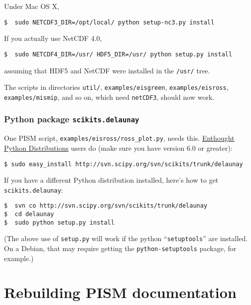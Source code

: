 \documentclass[11pt,final]{amsart}
\begin{document}
Under Mac OS X,
\begin{verbatim}
$  sudo NETCDF3_DIR=/opt/local/ python setup-nc3.py install
\end{verbatim}
If you actually use NetCDF 4.0,
\begin{verbatim}
$  sudo NETCDF4_DIR=/usr/ HDF5_DIR=/usr/ python setup.py install
\end{verbatim}
assuming that HDF5 and NetCDF were installed in the \texttt{/usr/} tree.

The scripts in directories \texttt{util/}, \texttt{examples/eisgreen}, \texttt{examples/eisross}, \texttt{examples/mismip}, and so on, which need \texttt{netCDF3}, should now work.


\subsubsection*{Python package \texttt{scikits.delaunay}}  One PISM script, \texttt{examples/eisross/ross_plot.py}, needs this. \href{http://www.enthought.com/}{Enthought Python Distributions} users do (make sure you have version 6.0 or greater): 
\begin{verbatim}
$ sudo easy_install http://svn.scipy.org/svn/scikits/trunk/delaunay
\end{verbatim}
If you have a different Python distribution installed, here's how to get \texttt{scikits.delaunay}:
\begin{verbatim}
$  svn co http://svn.scipy.org/svn/scikits/trunk/delaunay
$  cd delaunay
$  sudo python setup.py install
\end{verbatim}
(The above use of \texttt{setup.py} will work if the python ``\texttt{setuptools}'' are installed.  On a Debian, that may require getting the \texttt{python-setuptools} package, for example.)

\newpage
\section{Rebuilding PISM documentation}
\label{sec:docs}
\end{document}
